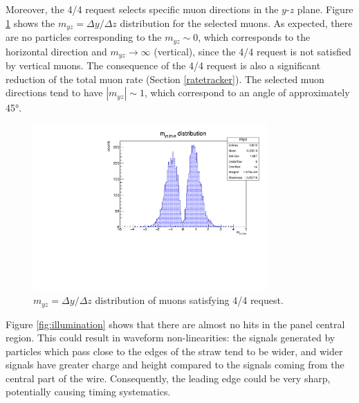 Moreover, the 4/4 request selects specific 
muon directions in the $y$-$z$ plane. 
Figure \ref{fig:myz} shows the 
$m_{yz}=\Delta y /\Delta z$ distribution 
for the selected muons. 
As expected, there are no particles corresponding 
to the $m_{yz}\sim 0$, which corresponds to the  
horizontal direction and 
$m_{yz} \rightarrow \infty$ (vertical), since the 
4/4 request is not satisfied by vertical muons. 
The consequence of the 4/4 request is also a 
significant reduction of the total muon rate 
(Section \ref{ratetracker}). 
The selected muon  
directions tend to have  
$|m_{yz}| \sim 1$, which correspond to  
an angle of approximately 45°.
\begin{figure}[!h]
    \centering
    \includegraphics[width =0.8\textwidth]{figures/pdf/myz.pdf}
    \caption[The $y-z$ direction 
    distribution of muons satisfying 4/4 request.]{
        $m_{yz}=\Delta y /\Delta z$  
    distribution of muons satisfying 4/4 request.}
    \label{fig:myz}
\end{figure}

Figure \ref{fig:illumination} 
shows that there are almost no hits in the 
panel central region. This could result in 
waveform non-linearities: the signals generated by 
particles which pass close to the edges of 
the straw tend to be wider, and wider signals 
have greater charge and height compared 
to the signals coming from the 
central part of the wire. Consequently, the leading 
edge could be very sharp, potentially 
causing timing systematics. 

